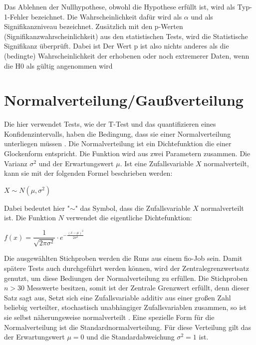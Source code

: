 Das Ablehnen der Nullhypothese, obwohl die Hypothese erfüllt ist, wird als Typ-1-Fehler bezeichnet.
Die Wahrscheinlichkeit dafür wird als $\alpha$ und als Signifikanzniveau bezeichnet. 
Zusätzlich mit den p-Werten (Signifikanzwahrscheinlichkeit) aus den statistischen Tests, wird die Statistische Signifikanz überprüft.
Dabei ist Der Wert p ist also nichts anderes als die (bedingte) Wahrscheinlichkeit der erhobenen oder
noch extremerer Daten, wenn die H0 als gültig angenommen wird \cite{inferenzstatistik}

\section{Normalverteilung/Gaußverteilung}

Die hier verwendet Tests, wie der T-Test und das quantifizieren eines Konfidenzintervalls, 
haben die Bedingung, dass sie einer Normalverteilung unterliegen müssen \cite{inferenzstatistik}.
Die Normalverteilung ist ein Dichtefunktion die einer Glockenform entspricht.
Die Funktion wird aus zwei Parametern zusammen. Die Varianz $\sigma^2$ und der Erwartungswert $\mu$.
Ist eine Zufallsvariable $X$ normalverteilt, kann sie mit der folgenden Formel beschrieben werden:

\begin{center}
  $X \sim N(\mu,\sigma^2)$
\end{center}

Dabei bedeutet hier "$\sim$" das Symbol, dass die Zufallsvariable $X$ normalverteilt ist.
Die Funktion $N$ verwendet die eigentliche Dichtefunktion:

\begin{center}
  $f(x) = \dfrac{1}{\sqrt{2\pi\sigma^2}} \cdot e^{-\frac{(x-\mu)^2}{2\sigma^2}}$
\end{center}

Die ausgewählten Stichproben werden die Runs aus einem fio-Job sein.
Damit spätere Tests auch durchgeführt werden können, wird der Zentralegrenzwertsatz genutzt, um diese Bediungen der Normalverteilung zu erfüllen.
Die Stichproben $n > 30$ Messwerte besitzen, somit ist der Zentrale Grenzwert erfüllt, denn dieser Satz sagt aus, 
Setzt sich eine Zufallsvariable additiv aus einer großen Zahl beliebig verteilter, stochastisch unabhängiger
Zufallsvariablen zusammen, so ist sie selbst näherungsweise normalverteilt \cite{statistically_rigorous}.
Eine spezielle Form für die Normalverteilung ist die Standardnormalverteilung.
Für diese Verteilung gilt das der Erwartungswert $\mu = 0$ und die Standardabweichung $\sigma^2 = 1$ ist.


